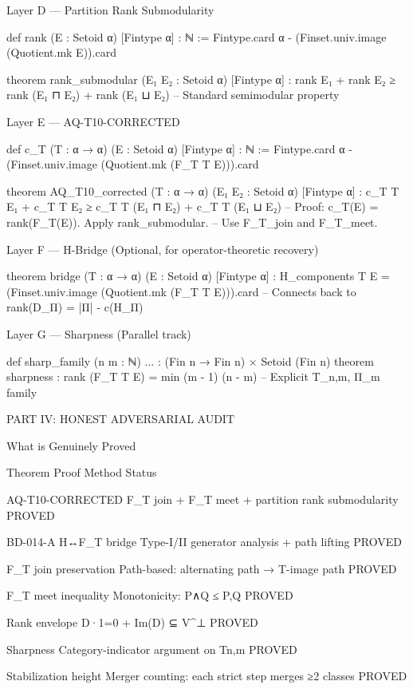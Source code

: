 Layer D — Partition Rank Submodularity


def rank (E : Setoid α) [Fintype α] : ℕ :=  
  Fintype.card α - (Finset.univ.image (Quotient.mk E)).card  
  
theorem rank_submodular (E₁ E₂ : Setoid α) [Fintype α] :  
  rank E₁ + rank E₂ ≥ rank (E₁ ⊓ E₂) + rank (E₁ ⊔ E₂)  
-- Standard semimodular property  



Layer E — AQ-T10-CORRECTED


def c_T (T : α → α) (E : Setoid α) [Fintype α] : ℕ :=  
  Fintype.card α - (Finset.univ.image (Quotient.mk (F_T T E))).card  
  
theorem AQ_T10_corrected (T : α → α) (E₁ E₂ : Setoid α) [Fintype α] :  
  c_T T E₁ + c_T T E₂ ≥ c_T T (E₁ ⊓ E₂) + c_T T (E₁ ⊔ E₂)  
-- Proof: c_T(E) = rank(F_T(E)). Apply rank_submodular.  
-- Use F_T_join and F_T_meet.  



Layer F — H-Bridge (Optional, for operator-theoretic recovery)


theorem bridge (T : α → α) (E : Setoid α) [Fintype α] :  
  H_components T E = (Finset.univ.image (Quotient.mk (F_T T E))).card  
-- Connects back to rank(D_Π) = |Π| - c(H_Π)  



Layer G — Sharpness (Parallel track)


def sharp_family (n m : ℕ) ... : (Fin n → Fin n) × Setoid (Fin n)  
theorem sharpness : rank (F_T T E) = min (m - 1) (n - m)  
-- Explicit T_{n,m}, Π_m family  




PART IV: HONEST ADVERSARIAL AUDIT


What is Genuinely Proved


Theorem	Proof Method	Status	

AQ-T10-CORRECTED	F_T join + F_T meet + partition rank submodularity	PROVED	

BD-014-A H↔F_T bridge	Type-I/II generator analysis + path lifting	PROVED	

F_T join preservation	Path-based: alternating path → T-image path	PROVED	

F_T meet inequality	Monotonicity: P∧Q ≤ P,Q	PROVED	

Rank envelope	D·1=0 + Im(D) ⊆ V^⊥	PROVED	

Sharpness	Category-indicator argument on T{n,m}	PROVED	

Stabilization height	Merger counting: each strict step merges ≥2 classes	PROVED	

